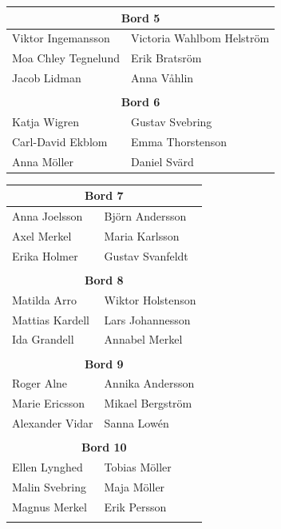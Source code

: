 \documentclass[a5paper]{article}
\begin{document}
\begin{landscape}
\begin{center}
\begin{tabular}{  l  l }
			\multicolumn{2}{c}{\textbf{Bord 5}} 				\\ \hline
			Viktor Ingemansson	&	Victoria Wahlbom Helström	\\
			Moa Chley Tegnelund	&	Erik Bratsröm				\\ 
			Jacob Lidman	&	Anna Våhlin						\\ 
			& \\  
			
			\multicolumn{2}{c}{\textbf{Bord 6}} 		\\ \hline
			Katja Wigren	&	Gustav Svebring			\\
			Carl-David Ekblom	&	Emma Thorstenson	\\ 
			Anna Möller	&	Daniel Svärd				\\ 
			
		\end{tabular}
		\quad \hspace*{2cm}
		\begin{tabular}{  l  l }
				\multicolumn{2}{c}{\textbf{Bord 7}} 				\\ \hline
				Anna Joelsson	&	Björn Andersson	\\
				Axel Merkel		&	Maria Karlsson	\\ 
				Erika Holmer	&	Gustav Svanfeldt	\\ 
				&										\\ 
				
				\multicolumn{2}{c}{\textbf{Bord 8}} 				\\ \hline
				Matilda Arro	&	Wiktor Holstenson	\\
				Mattias Kardell	&	Lars Johannesson	\\ 
				Ida Grandell	&	Annabel Merkel	\\ 
				&										\\ 
				
				\multicolumn{2}{c}{\textbf{Bord 9}} 				\\ \hline
				Roger Alne	&	Annika Andersson	\\
				Marie Ericsson	&	Mikael Bergström	\\ 
				Alexander Vidar	&	Sanna Lowén	\\
				&										\\ 
				
				\multicolumn{2}{c}{\textbf{Bord 10}} 				\\ \hline
				Ellen Lynghed	&	Tobias Möller	\\
				Malin Svebring	&	Maja Möller	\\ 
				Magnus Merkel	&	Erik Persson	\\ 
				&										\\ 
				

\end{tabular}
\end{center}
\end{landscape}
\end{document}
